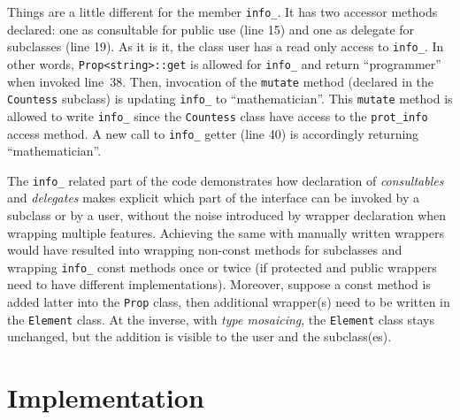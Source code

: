 \documentclass{article}
\begin{document}
Things are a little different for the member \texttt{info\_}. It has two accessor methods declared: one as consultable for public use (line 15) and one as delegate for subclasses (line 19). As it is it, the class user has a read only access to \texttt{info\_}. In other words, \texttt{Prop<string>::get} is allowed for \texttt{info\_} and return ``programmer'' when invoked line~38. Then, invocation of the \texttt{mutate} method (declared in the \texttt{Countess} subclass) is updating \texttt{info\_} to ``mathematician''. This \texttt{mutate} method is allowed to write \texttt{info\_} since the \texttt{Countess} class have access to the \texttt{prot\_info} access method. A new call to \texttt{info\_} getter (line 40) is accordingly returning ``mathematician''. 

The \texttt{info\_} related part of the code demonstrates how declaration of \textit{consultables} and \textit{delegates} makes explicit which part of the interface can be invoked by a subclass or by a user, without the noise introduced by wrapper declaration when wrapping multiple features. Achieving the same with manually written wrappers would have resulted into wrapping non-const methods for subclasses and wrapping \texttt{info\_} const methods once or twice (if protected and public wrappers need to have different implementations). Moreover, suppose a const method is added latter into the \texttt{Prop} class, then additional wrapper(s) need to be written in the \texttt{Element} class. At the inverse, with \textit{type mosaicing}, the \texttt{Element} class stays unchanged, but the addition is visible to the user and the subclass(es).

\section{Implementation}
\end{document}
